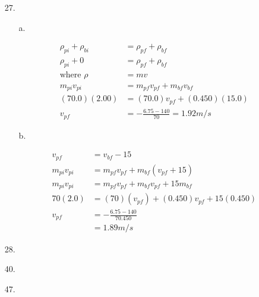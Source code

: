     \begin{itemize}
        \item [27.]
        
        \begin{itemize}
            \item [a.]
            
            \begin{align*}
                \rho_{pi} + \rho_{bi}   & = \rho_{pf} + \rho_{bf}       \\
                \rho_{pi} + 0           & = \rho_{pf} + \rho_{bf}       \\
                \text{where } \rho      & = mv                          \\
                m_{pi}v_{pi}            & = m_{pf}v_{pf} + m_{bf}v_{bf} \\
                (70.0)(2.00)            & = (70.0)v_{pf} + (0.450)(15.0)\\
                v_{pf}                  & = -\frac{6.75-140}{70} = \boxed{1.92m/s}
            \end{align*}

            \item [b.]
            
            \begin{align*}
                v_{pf}                  & = v_{bf} - 15                 \\
                m_{pi}v_{pi}            & = m_{pf}v_{pf} 
                                          + m_{bf}(v_{pf} + 15)         \\
                m_{pi}v_{pi}            & = m_{pf}v_{pf} 
                                          + m_{bf}v_{pf} + 15m_{bf}     \\
                70(2.0)                 & = (70)(v_{pf}) + (0.450)v_{pf}
                                          + 15(0.450)                   \\
                v_{pf}                  & = -\frac{6.75 - 140}{70.450}  \\
                                        & = \boxed{1.89 m/s}
            \end{align*}
        \end{itemize}

        \item [28.]
        \item [40.]
        \item [47.]
    \end{itemize}

